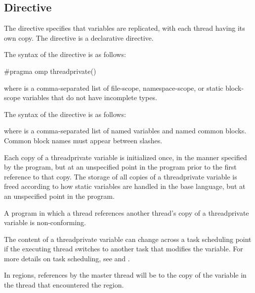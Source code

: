 \subsection{ Directive}
\label{subsec:threadprivate Directive}
\summary
The  directive specifies that variables are replicated, with each thread
having its own copy. The  directive is a declarative directive.
\syntax
\begin{ccppspecific}
The syntax of the  directive is as follows:

\begin{ompcPragma}
#pragma omp threadprivate() 
\end{ompcPragma}

where  is a comma-separated list of file-scope, namespace-scope, or static
block-scope variables that do not have incomplete types.
\end{ccppspecific}
%
\begin{fortranspecific}
The syntax of the  directive is as follows:


where  is a comma-separated list of named variables and named common blocks.
Common block names must appear between slashes.
\end{fortranspecific}

\descr
Each copy of a threadprivate variable is initialized once, in the manner specified by the
program, but at an unspecified point in the program prior to the first reference to that
copy. The storage of all copies of a threadprivate variable is freed according to how
static variables are handled in the base language, but at an unspecified point in the
program.

A program in which a thread references another thread's copy of a threadprivate variable
is non-conforming.

The content of a threadprivate variable can change across a task scheduling point if the
executing thread switches to another task that modifies the variable. For more details on
task scheduling, see
 and
.

In  regions, references by the master thread will be to the copy of the
variable in the thread that encountered the  region.

